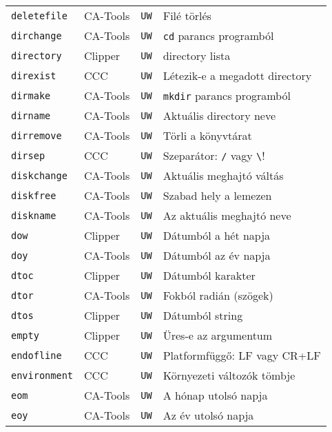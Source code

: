 \begin{tabular}{|l|l|l|l|}
\verb!deletefile!                  & CA-Tools &  {\tt UW} & Filé törlés\\
\verb!dirchange!                   & CA-Tools &  {\tt UW} & \verb!cd! parancs programból\\
\verb!directory!                   & Clipper  &  {\tt UW} & directory lista\\
\verb!direxist!                    & CCC      &  {\tt UW} & Létezik-e a megadott directory\\
\verb!dirmake!                     & CA-Tools &  {\tt UW} & \verb!mkdir! parancs programból\\
\verb!dirname!                     & CA-Tools &  {\tt UW} & Aktuális directory neve\\
\verb!dirremove!                   & CA-Tools &  {\tt UW} & Törli a könyvtárat\\
\verb!dirsep!                      & CCC      &  {\tt UW} & Szeparátor: \verb!/! vagy \verb!\!\\
\verb!diskchange!                  & CA-Tools &  {\tt UW} & Aktuális meghajtó váltás\\
\verb!diskfree!                    & CA-Tools &  {\tt UW} & Szabad hely a lemezen\\
\verb!diskname!                    & CA-Tools &  {\tt UW} & Az aktuális meghajtó neve\\
\verb!dow!                         & Clipper  &  {\tt UW} & Dátumból a hét napja\\
\verb!doy!                         & CA-Tools &  {\tt UW} & Dátumból az év napja\\
\verb!dtoc!                        & Clipper  &  {\tt UW} & Dátumból karakter\\
\verb!dtor!                        & CA-Tools &  {\tt UW} & Fokból radián (szögek)\\
\verb!dtos!                        & Clipper  &  {\tt UW} & Dátumból string\\
\verb!empty!                       & Clipper  &  {\tt UW} & Üres-e az argumentum\\
\verb!endofline!                   & CCC      &  {\tt UW} & Platformfüggő: LF vagy CR+LF\\
\verb!environment!                 & CCC      &  {\tt UW} & Környezeti változók tömbje\\
\verb!eom!                         & CA-Tools &  {\tt UW} & A hónap utolsó napja\\
\verb!eoy!                         & CA-Tools &  {\tt UW} & Az év utolsó napja\\

\end{tabular}
